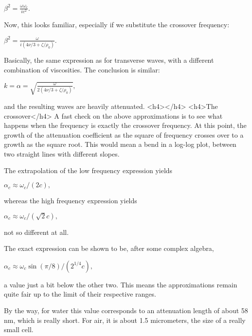 $ \beta^2 = \frac{\omega\omega_c}{i c^2} .$

Now, this looks familiar, especially if we substitute the crossover frequency:

$ \beta^2 = \frac{\omega}{i(4\nu/3+\zeta/\rho_0)} .$

Basically, the same expression as for transverse waves, with a different combination of viscosities. The conclusion is similar:

$ k=\alpha =\sqrt{ \frac{\omega}{ 2(4\nu/3+\zeta/\rho_0)}},$

and the resulting waves are heavily attenuated.
<h4></h4>
<h4>The crossover</h4>
A fast check on the above approximations is to see what happens when the frequency is exactly the crossover frequency. At this point, the growth of the attenuation coefficient as the square of frequency crosses over to a growth as the square root. This would mean a bend in a log-log plot, between two straight lines with different slopes.

The extrapolation of the low frequency expression yields

$ \alpha_c\approx \omega_c/(2 c) , $

whereas the high frequency expression yields

$ \alpha_c\approx \omega_c/(\sqrt{2} c) , $

not so different at all.

The exact expression can be shown to be, after some complex algebra,

$ \alpha_c\approx \omega_c \sin(\pi/8) / (2^{1/4} c) , $

a value just a bit below the other two. This means the approximations remain quite fair up to the limit of their respective ranges.

By the way, for water this value corresponds to an attenuation length of about 58 nm, which is really short. For air, it is about 1.5 micrometers, the size of a really small cell.

 
